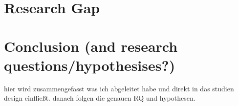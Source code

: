 \section{Research Gap}

\section{Conclusion (and research questions/hypothesises?)}
hier wird zusammengefasst was ich abgeleitet habe und direkt in das studien design einfließt. danach folgen die genauen RQ und hypothesen.

